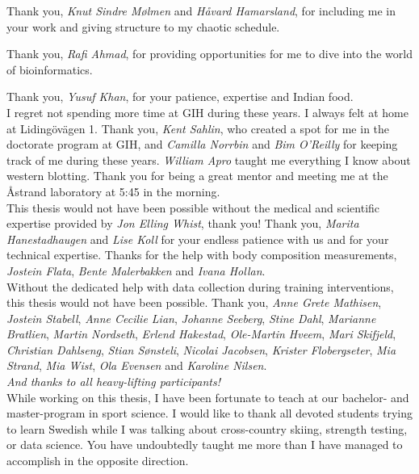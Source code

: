 \documentclass[twoside,10pt]{gihclass} %
\begin{document}
Thank you, \emph{Knut Sindre Mølmen} and \emph{Håvard Hamarsland}, for including me in your work and giving structure to my chaotic schedule.

Thank you, \emph{Rafi Ahmad}, for providing opportunities for me to dive into the world of bioinformatics.

Thank you, \emph{Yusuf Khan}, for your patience, expertise and Indian food.\\

I regret not spending more time at GIH during these years. I always felt at home at Lidingövägen 1.
Thank you, \emph{Kent Sahlin}, who created a spot for me in the doctorate program at GIH, and \emph{Camilla Norrbin} and \emph{Bim O'Reilly} for keeping track of me during these years.
\emph{William Apro} taught me everything I know about western blotting. Thank you for being a great mentor and meeting me at the Åstrand laboratory at 5:45 in the morning.\\

This thesis would not have been possible without the medical and scientific expertise provided by \emph{Jon Elling Whist}, thank you!
Thank you, \emph{Marita Hanestadhaugen} and \emph{Lise Koll} for your endless patience with us and for your technical expertise.
Thanks for the help with body composition measurements, \emph{Jostein Flata}, \emph{Bente Malerbakken} and \emph{Ivana Hollan}.\\

Without the dedicated help with data collection during training interventions, this thesis would not have been possible. Thank you, \emph{Anne Grete Mathisen}, \emph{Jostein Stabell}, \emph{Anne Cecilie Lian}, \emph{Johanne Seeberg}, \emph{Stine Dahl}, \emph{Marianne Bratlien}, \emph{Martin Nordseth}, \emph{Erlend Hakestad}, \emph{Ole-Martin Hveem}, \emph{Mari Skifjeld}, \emph{Christian Dahlseng}, \emph{Stian Sønsteli}, \emph{Nicolai Jacobsen}, \emph{Krister Flobergseter}, \emph{Mia Strand}, \emph{Mia Wist}, \emph{Ola Evensen} and \emph{Karoline Nilsen}.\\

\emph{And thanks to all heavy-lifting participants!}\\

While working on this thesis, I have been fortunate to teach at our bachelor- and master-program in sport science. I would like to thank all devoted students trying to learn Swedish while I was talking about cross-country skiing, strength testing, or data science. You have undoubtedly taught me more than I have managed to accomplish in the opposite direction.\\
\end{document}
